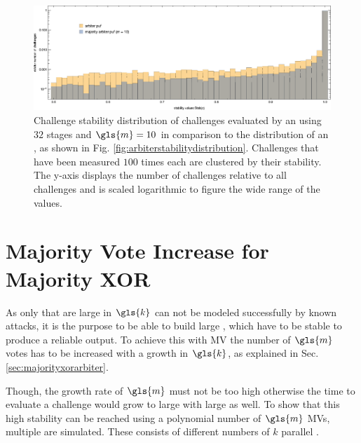 \begin{figure}[ht]
\includegraphics[width=1.00\textwidth]{images/comparison-arbiter-stability-distribution-majority-arbiter-stability-distribution.eps}
\caption[Challenge stability distribution of an \mpuf]{Challenge stability distribution of challenges evaluated by an \mpuf using $32$ stages and $\gls{m} = 10$ in comparison to the distribution of an \apuf, as shown in Fig. \ref{fig:arbiterstabilitydistribution}. Challenges that have been measured $100$ times each are clustered by their stability. The y-axis displays the number of challenges relative to all challenges and is scaled logarithmic to figure the wide range of the values.} 
\label{fig:comparisonarbiterstabilitydistributionmajorityarbiterstabilitydistribution}
\end{figure}



\section{Majority Vote Increase for Majority \acs{XOR} \apufs}
\label{sec:majorityvotegrowth}

As only \xpufs that are large in $\gls{k}$ can not be modeled successfully by known attacks, it is the purpose to be able to build large \xpufs, which have to be stable to produce a reliable output. %
To achieve this with \ac{MV} the number of $\gls{m}$ votes has to be increased with a growth in $\gls{k}$, as explained in Sec. \ref{sec:majorityxorarbiter}.

Though, the growth rate of $\gls{m}$ must not be too high otherwise the time to evaluate a challenge would grow to large with large \xpufs as well. %
To show that this high stability can be reached using a polynomial number of $\gls{m}$ \acp{MV}, multiple \mxpufs are simulated.
These \mxpufs consists of different numbers of $k$ parallel \mpufs.

